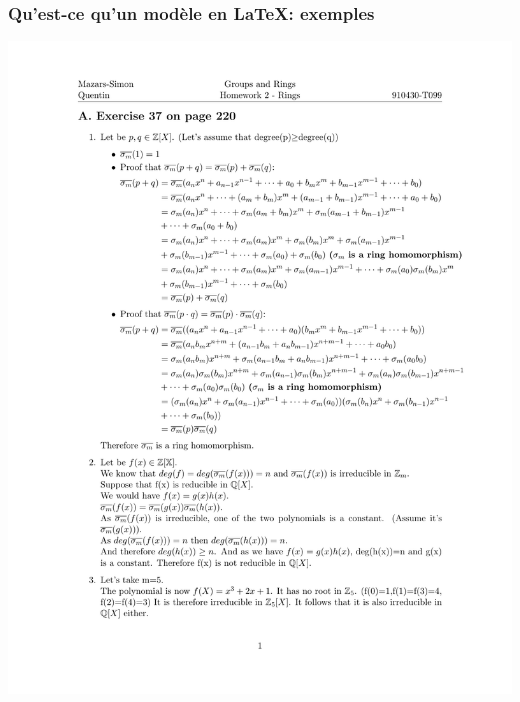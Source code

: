 \documentclass{clic_latex_beamer}
\begin{document}
 \begin{frame}
\frametitle{Qu'est-ce qu'un modèle en \LaTeX: exemples}
\centering
\includegraphics[height=\textheight]{illustrations/macros/serie_exemple.pdf}
 \end{frame}
 
\end{document}
